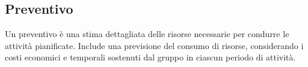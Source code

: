 \subsection{Preventivo}
Un preventivo è una stima dettagliata delle risorse necessarie per condurre le attività pianificate. Include una previsione del consumo di risorse, considerando i costi economici e temporali sostenuti dal gruppo in ciascun periodo di attività.